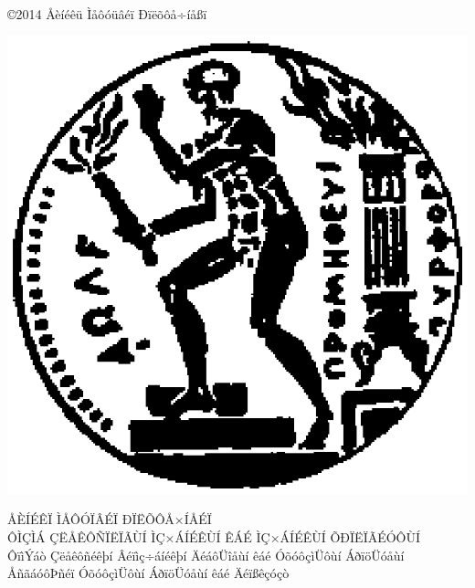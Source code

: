 \documentclass[12pt, twoside, a4paper]{book}
\begin{document}
\noindent
 \\
 \\
 \\
\vspace{8ex}

\noindent
\\
\\
 \\
\vspace{26ex}

\small
\noindent
\copyright \hspace{1em}2014 Åèíéêü Ìåôóüâéï Ðïëõôå÷íåßï

\newpage
\thispagestyle{empty}
\vspace{-6ex}
\begin{center}
\includegraphics[scale=1]{pyrforos.eps}

\Large{Å}\large{ÈÍÉÊÏ}
\Large{Ì}\large{ÅÔÓÏÂÉÏ}
\Large{Ð}\large{ÏËÕÔÅ×ÍÅÉÏ} \\
\normalsize{Ô}\small{ÌÇÌÁ}
\normalsize{Ç}\small{ËÅÊÔÑÏËÏÃÙÍ}
\normalsize{Ì}\small{Ç×ÁÍÉÊÙÍ}
\normalsize{Ê}\small{ÁÉ}
\normalsize{Ì}\small{Ç×ÁÍÉÊÙÍ}
\normalsize{Õ}\small{ÐÏËÏÃÉÓÔÙÍ} \\
\vspace{2ex}
ÔïìÝáò Çëåêôñéêþí Âéïìç÷áíéêþí ÄéáôÜîåùí êáé ÓõóôçìÜôùí ÁðïöÜóåùí \\
ÅñãáóôÞñéï ÓõóôçìÜôùí ÁðïöÜóåùí êáé Äéïßêçóçò \\
\end{center}
\end{document}
